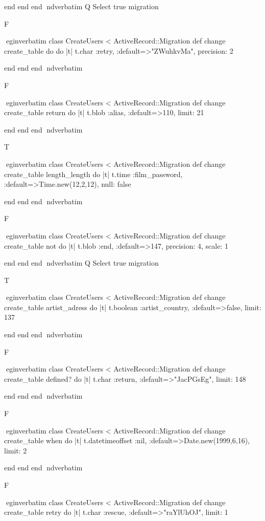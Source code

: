     end 
  end 
end
nd{verbatim}
Q
 Select true migration

F

egin{verbatim}
 class CreateUsers < ActiveRecord::Migration 
  def change 
    create_table do do |t| 
      t.char :retry, :default=>"ZWuhkvMa", precision: 2
    
    end 
  end 
end
nd{verbatim}

F

egin{verbatim}
 class CreateUsers < ActiveRecord::Migration 
  def change 
    create_table return do |t| 
      t.blob :alias, :default=>110, limit: 21
    
    end 
  end 
end
nd{verbatim}

T

egin{verbatim}
 class CreateUsers < ActiveRecord::Migration 
  def change 
    create_table length_length do |t| 
      t.time :film_password, :default=>Time.new(12,2,12), null: false
    
    end 
  end 
end
nd{verbatim}

F

egin{verbatim}
 class CreateUsers < ActiveRecord::Migration 
  def change 
    create_table not do |t| 
      t.blob :end, :default=>147, precision: 4, scale: 1
    
    end 
  end 
end
nd{verbatim}
Q
 Select true migration

T

egin{verbatim}
 class CreateUsers < ActiveRecord::Migration 
  def change 
    create_table artist_adress do |t| 
      t.boolean :artist_country, :default=>false, limit: 137
    
    end 
  end 
end
nd{verbatim}

F

egin{verbatim}
 class CreateUsers < ActiveRecord::Migration 
  def change 
    create_table defined? do |t| 
      t.char :return, :default=>"JacPGsEg", limit: 148
    
    end 
  end 
end
nd{verbatim}

F

egin{verbatim}
 class CreateUsers < ActiveRecord::Migration 
  def change 
    create_table when do |t| 
      t.datetimeoffset :nil, :default=>Date.new(1999,6,16), limit: 2
    
    end 
  end 
end
nd{verbatim}

F

egin{verbatim}
 class CreateUsers < ActiveRecord::Migration 
  def change 
    create_table retry do |t| 
      t.char :rescue, :default=>"raYlUhOJ", limit: 1
    
